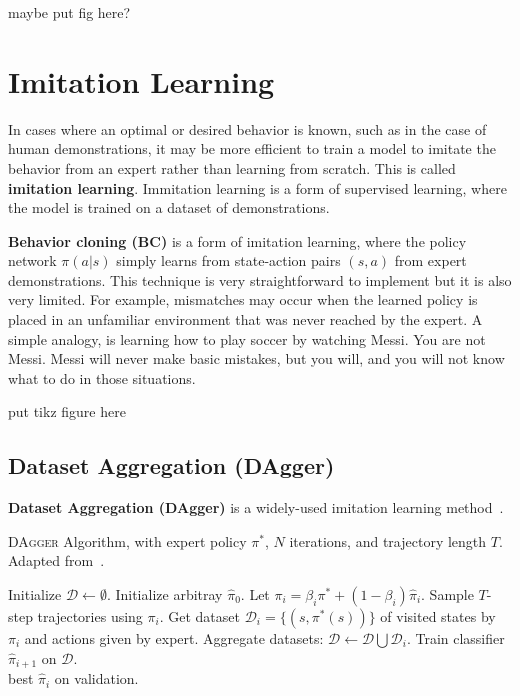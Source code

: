 \documentclass[12pt]{report}
\theoremstyle{definition}
\theoremstyle{remark}
\begin{document}
maybe put fig here?

\section{Imitation Learning}
In cases where an optimal or desired behavior is known, such as in the case of human demonstrations, it may be more efficient to train a model to imitate the behavior from an expert rather than learning from scratch. This is called \textbf{imitation learning}. Immitation learning is a form of supervised learning, where the model is trained on a dataset of demonstrations.

\textbf{Behavior cloning (BC)} is a form of imitation learning, where the policy network $\pi(a|s)$ simply learns from state-action pairs $(s, a)$ from expert demonstrations. This technique is very straightforward to implement but it is also very limited. For example, mismatches may occur when the learned policy is placed in an unfamiliar environment that was never reached by the expert. A simple analogy, is learning how to play soccer by watching Messi. You are not Messi. Messi will never make basic mistakes, but you will, and you will not know what to do in those situations.

put tikz figure here


\subsection{Dataset Aggregation (DAgger)}

\textbf{Dataset Aggregation (DAgger)} is a widely-used imitation learning method~\cite{ross_reduction_2011}.
\begin{algorithm}
    \caption{\textsc{DAgger} Algorithm, with expert policy $\pi^*$, $N$ iterations, and trajectory length $T$. Adapted from~\cite{ross_reduction_2011}.}\label{alg:dagger}
    \begin{algorithmic}[1]
        \State Initialize $\mathcal{D} \leftarrow \emptyset$.
        \State Initialize arbitray $\hat{\pi}_0$.
        \State Let $\pi_i = \beta_i \pi^* + (1-\beta_i) \hat{\pi}_{i}$.
        \State Sample $T$-step trajectories using $\pi_i$.
        \State Get dataset $\mathcal{D}_i = \{ (s, \pi^*(s)) \}$ of visited states by $\pi_i$ and actions given by expert.
        \State Aggregate datasets: $\mathcal{D} \leftarrow \mathcal{D} \bigcup \mathcal{D}_i$.
        \State Train classifier $\hat{\pi}_{i+1}$ on $\mathcal{D}$.
        \EndFor \\
        \Return best $\hat{\pi}_i$ on validation.
    \end{algorithmic}
\end{algorithm}
\end{document}
